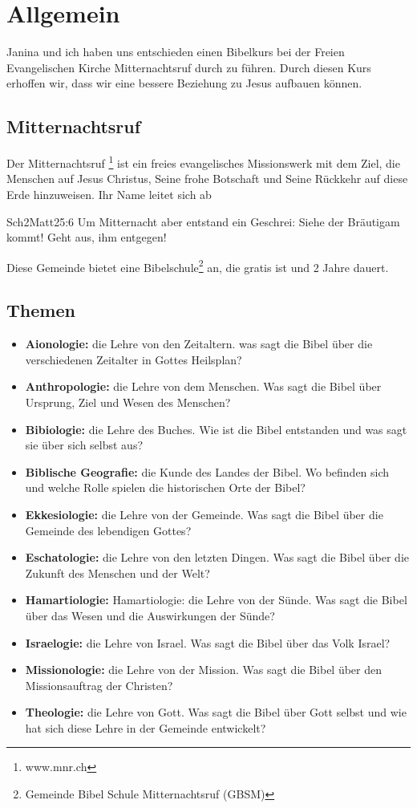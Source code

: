 \chapter{Allgemein}
Janina und ich haben uns entschieden einen Bibelkurs bei der Freien Evangelischen Kirche Mitternachtsruf durch zu führen. Durch diesen Kurs erhoffen wir, dass wir eine bessere Beziehung zu Jesus aufbauen können.

\section{Mitternachtsruf}
Der Mitternachtsruf \footnote{www.mnr.ch} ist ein freies evangelisches Missionswerk mit dem Ziel, die Menschen auf Jesus Christus, Seine frohe Botschaft und Seine Rückkehr auf diese Erde hinzuweisen. Ihr Name leitet sich ab \begin{bibeltext}{Sch2}{Matt}{25:6}
    			Um Mitternacht aber entstand ein Geschrei: \glqq Siehe der Bräutigam kommt! Geht aus, ihm entgegen!\grqq{}
    		\end{bibeltext}
Diese Gemeinde bietet eine Bibelschule\footnote{Gemeinde Bibel Schule Mitternachtsruf (GBSM)} an, die gratis ist und 2 Jahre dauert. 

\section{Themen}
\begin{itemize}
    \item \textbf{Aionologie: }die Lehre von den Zeitaltern. was sagt die Bibel über die verschiedenen Zeitalter in Gottes Heilsplan?
    \item \textbf{Anthropologie: }die Lehre von dem Menschen.
    Was sagt die Bibel über Ursprung, Ziel und Wesen des Menschen?
    \item \textbf{Bibiologie: }die Lehre des Buches. Wie ist die Bibel entstanden und was sagt sie über sich selbst aus?
    \item \textbf{Biblische Geografie: }die Kunde des Landes der Bibel. Wo befinden sich und welche Rolle spielen die historischen Orte der Bibel?
    \item \textbf{Ekkesiologie: }die Lehre von der Gemeinde. Was sagt die Bibel über die Gemeinde des lebendigen Gottes?
    \item \textbf{Eschatologie: }die Lehre von den letzten Dingen. Was sagt die Bibel über die Zukunft des Menschen und der Welt?
    \item \textbf{Hamartiologie: }Hamartiologie: die Lehre von der Sünde. Was sagt die Bibel über das Wesen und die
    Auswirkungen der Sünde?
    \item \textbf{Israelogie: }die Lehre von Israel. Was sagt die Bibel über das Volk Israel?
    \item \textbf{Missionologie: }die Lehre von der Mission. Was sagt die Bibel über den Missionsauftrag der Christen?
    \item \textbf{Theologie: }die Lehre von Gott. Was sagt die Bibel über Gott selbst und wie hat sich diese Lehre in der Gemeinde entwickelt?
\end{itemize}
